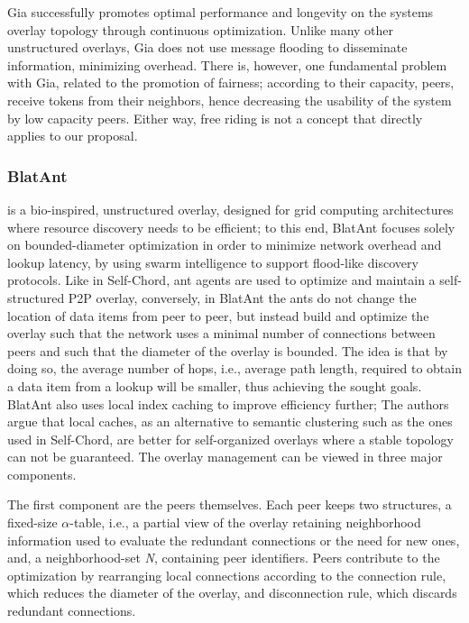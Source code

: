 \documentclass[runningheads]{llncs}
\begin{document}
Gia successfully promotes optimal performance and longevity on the systems overlay topology through continuous optimization. Unlike many other unstructured overlays, Gia does not use message flooding to disseminate information, minimizing overhead. There is, however, one fundamental problem with Gia, related to the promotion of fairness; according to their capacity, peers, receive tokens from their neighbors, hence decreasing the usability of the system by low capacity peers. Either way, free riding is not a concept that directly applies to our proposal.\newline

\subsubsection{BlatAnt} \cite{blatant} is a bio-inspired, unstructured overlay, designed for grid computing architectures where resource discovery needs to be efficient; to this end, BlatAnt focuses solely on bounded-diameter optimization in order to minimize network overhead and lookup latency, by using swarm intelligence to support flood-like discovery protocols. Like in Self-Chord, ant agents are used to optimize and maintain a self-structured P2P overlay, conversely, in BlatAnt the ants do not change the location of data items from peer to peer, but instead build and optimize the overlay such that the network uses a minimal number of connections between peers and such that the diameter of the overlay is bounded. The idea is that by doing so, the average number of hops, i.e., average path length, required to obtain a data item from a lookup will be smaller, thus achieving the sought goals. BlatAnt also uses local index caching to improve efficiency further; The authors argue that local caches,  as an alternative to semantic clustering such as the ones used in Self-Chord, are better for self-organized overlays where a stable topology can not be guaranteed. The overlay management can be viewed in three major components.

The first component are the peers themselves. Each peer keeps two structures, a   fixed-size $\alpha$-table, i.e., a partial view of the overlay retaining neighborhood information used to evaluate the redundant connections or the need for new ones, and, a neighborhood-set \textit{N}, containing peer identifiers. Peers contribute to the optimization by rearranging local connections according to the connection rule, which reduces the diameter of the overlay, and disconnection rule, which discards redundant connections.
\end{document}
